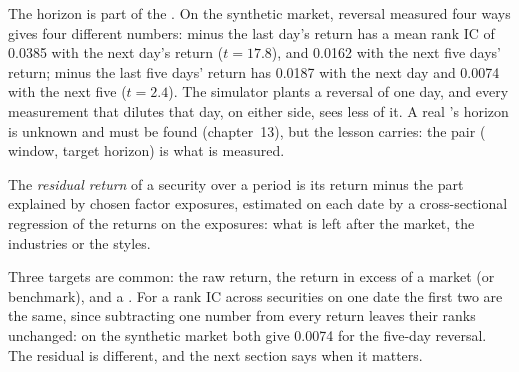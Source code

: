 \begin{omfigure}

\label{fig:rs:anatomy-of-a-predictor:timing}
\end{omfigure}

The horizon is part of the . On the synthetic market, reversal measured four ways gives four different numbers:
minus the last day's return has a mean rank IC of 0.0385 with the next day's return ($t = 17.8$), and 0.0162 with the next
five days' return; minus the last five days' return has 0.0187 with the next day and 0.0074 with the next five ($t = 2.4$).
The simulator plants a reversal of one day, and every measurement that dilutes that day, on either side, sees less of it. A
real 's horizon is unknown and must be found (chapter~13), but the lesson carries: the pair ( window,
target horizon) is what is measured.

\begin{definition}\label{def:rs:anatomy-of-a-predictor:residual}
The \emph{residual return} of a security over a period is its return minus the part explained by
chosen factor exposures, estimated on each date by a cross-sectional regression of the returns on the exposures: what is
left after the market, the industries or the styles.
\end{definition}

Three targets are common: the raw return, the return in excess of a market (or benchmark), and a . For a rank
IC across securities on one date the first two are the same, since subtracting one number from every return leaves their
ranks unchanged: on the synthetic market both give 0.0074 for the five-day reversal. The residual is different, and the
next section says when it matters.

